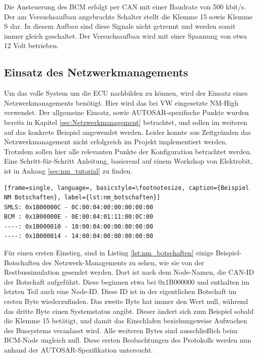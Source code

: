 \documentclass[
  a4paper,					    %
  twoside,
  DIV=calc,     				%
  bibliography=totoc,
  cleardoublepage=empty,
  ngerman,     					%
  final       					%
]{scrbook}
\begin{document}
Die Ansteuerung des BCM erfolgt per CAN mit einer Baudrate von 500 kbit/s. Der am Versuchsaufbau angebrachte Schalter stellt die Klemme 15 sowie Klemme S dar. In diesem Aufbau sind diese Signale nicht getrennt und werden somit immer gleich geschaltet. Der Versuchsaufbau wird mit einer Spannung von etwa 12 Volt betrieben.




\subsection{Einsatz des Netzwerkmanagements}
\label{sec:AutosarNM}
Um das volle System um die ECU nachbilden zu können, wird der Einsatz eines Netzwerkmanagements benötigt. Hier wird das bei VW eingesetzte NM-High verwendet. Der allgemeine Einsatz, sowie AUTOSAR-spezifische Punkte wurden bereits in Kapitel \ref{sec:Netzwerkmanagement} betrachtet, und sollen im weiteren auf das konkrete Beispiel angewendet werden. Leider konnte aus Zeitgründen das Netzwerkmanagement nicht erfolgreich im Projekt implementiert werden. Trotzdem sollen hier alle relevanten Punkte der Konfiguration betrachtet werden. Eine Schritt-für-Schritt Anleitung, basierend auf einem Workshop von Elektrobit, ist in Anhang \ref{sec:nm_tutorial} zu finden.

\begin{lstlisting}[frame=single, language=, basicstyle=\footnotesize, caption={Beispiel NM Botschaften}, label={lst:nm_botschaften}]
SMLS: 0x1B00000C - 0C:00:04:00:00:00:00:00
BCM : 0x1B00000E - 0E:00:04:01:11:00:0C:00
----: 0x1B000010 - 10:00:04:00:00:00:00:00
----: 0x1B000014 - 14:00:04:00:00:00:00:00
\end{lstlisting}

Für einen ersten Einstieg, sind in Listing \ref{lst:nm_botschaften} einige Beispiel-Botschaften des Netzwerk-Managements zu sehen, wie sie von der Restbussimulation gesendet werden. Dort ist nach dem Node-Namen, die CAN-ID der Botschaft aufgeführt. Diese beginnen etwa bei 0x1B000000 und enthalten im letzten Teil auch eine Node-ID. Diese ID ist in der eigentlichen Botschaft im ersten Byte wiederzufinden. Das zweite Byte hat immer den Wert null, während das dritte Byte einen Systemstatus angibt. Dieser ändert sich zum Beispiel sobald die Klemme 15 betätigt, und damit das Einschlafen beziehungsweise Aufwachen des Bussystems veranlasst wird. Alle weiteren Bytes sind ausschließlich beim BCM-Node ungleich null. Diese ersten Beobachtungen des Protokolls werden nun anhand der AUTOSAR-Spezifikation untersucht.
\end{document}
